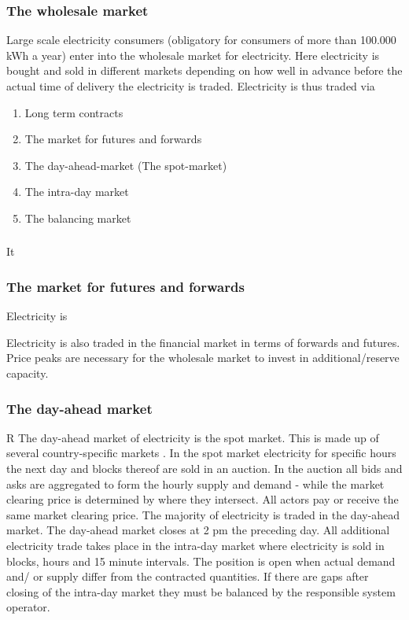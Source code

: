 \subsubsection{The wholesale market}
\label{subsubsec: t_whomarket}
Large scale electricity consumers (obligatory for consumers of more than 100.000 kWh a year) enter into the wholesale market for electricity. Here  electricity is bought and sold in different markets depending on how well in advance before the actual time of delivery the electricity is traded. Electricity is thus traded via 
\begin{enumerate}
    \item Long term contracts 
    \item The market for futures and forwards
    \item The day-ahead-market (The spot-market) 
    \item The intra-day market
    \item The balancing market
\end{enumerate}

\subsubsection*{}
It

\subsubsection*{The market for futures and forwards}
Electricity is 

Electricity is also traded in the financial market in terms of forwards and futures. Price peaks are necessary for the wholesale market to invest in additional/reserve capacity. 

\subsubsection*{The day-ahead market}
R
The day-ahead market of electricity is the spot market. This is made up of several country-specific markets . In the spot market electricity for specific hours the next day and blocks thereof are sold in an auction. In the auction all bids and asks are aggregated to form the hourly supply and demand - while the market clearing price is determined by where they intersect. All actors pay or receive the same market clearing price. The majority of electricity is traded in the day-ahead market. %
The day-ahead market closes at 2 pm the preceding day. All additional electricity trade takes place in the intra-day market where electricity is sold in blocks, hours and 15 minute intervals. The position is open when actual demand and/ or supply differ from the contracted quantities. If there are gaps after closing of the intra-day market they must be balanced by the responsible system operator.  





